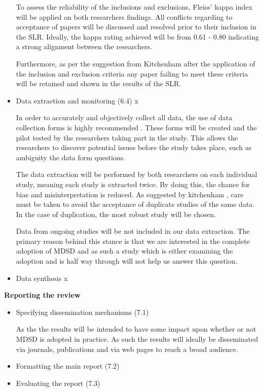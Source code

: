 \documentclass[10pt,twocolumn]{article}
\begin{document}
\begin{itemize}

To assess the reliability of the inclusions and exclusions, Fleiss' kappa index will be applied on both researchers findings. All conflicts regarding to acceptance of papers will be discussed and resolved prior to their inclusion in the SLR. Ideally, the kappa rating achieved will be from 0.61 - 0.80 indicating a strong alignment between the researchers. 

Furthermore, as per the suggestion from Kitchenham \cite{kitchenham2007guidelines} after the application of the inclusion and exclusion criteria any paper failing to meet these criteria will be retained and shown in the results of the SLR.


\item Data extraction and monitoring (6.4) x

In order to accurately and objectively collect all data, the use of data collection forms is highly recommended \cite{kitchenham2007guidelines}. These forms will be created and the pilot tested by the researchers taking part in the study. This allows the researchers to discover potential issues before the study takes place, such as ambiguity the data form questions.

The data extraction will be performed by both researchers on each individual study, meaning each study is extracted twice. By doing this, the chance for bias and misinterpretation is reduced. As suggested by kitchenham \cite{kitchenham2007guidelines}, care must be taken to avoid the acceptance of duplicate studies of the same data. In the case of duplication, the most robust study will be chosen.

Data from ongoing studies will be not included in our data extraction. The primary reason behind this stance is that we are interested in the complete adoption of MDSD and as such a study which is either examining the adoption and is half way through will not help us answer this question.

\item Data synthesis x
\end{itemize}

\textbf{Reporting the review}
\begin{itemize}
\item Specifying dissemination mechanisms (7.1)

As the the results will be intended to have some impact upon whether or not MDSD is adopted in practice. As such the results will ideally be disseminated via journals, publications and via web pages to reach a broad audience.

\item Formatting the main report (7.2)
\item Evaluating the report (7.3)
\end{itemize} 
\end{document}
